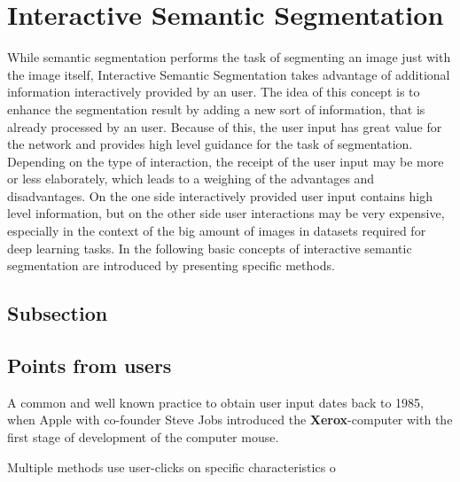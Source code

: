 
\section{Interactive Semantic Segmentation}\label{ord:ch2:sec3}

While semantic segmentation performs the task of segmenting an image just with the image itself, Interactive Semantic Segmentation takes advantage of additional information interactively provided by an user.
The idea of this concept is to enhance the segmentation result by adding a new sort of information, that is already processed by an user.
Because of this, the user input has great value for the network and provides high level guidance for the task of segmentation.
Depending on the type of interaction, the receipt of the user input may be more or less elaborately, which leads to a weighing of the advantages and disadvantages.
On the one side interactively provided user input contains high level information, but on the other side user interactions may be very expensive, especially in the context of the big amount of images in datasets required for deep learning tasks.
In the following basic concepts of interactive semantic segmentation are introduced by presenting specific methods.
 

\subsection{Subsection}\label{ord:ch2:sec3:subsec1}

\subsection{Points from users}\label{ord:ch2:sec3:subsec2}

A common and well known practice to obtain user input dates back to 1985, when Apple with co-founder Steve Jobs introduced the \textbf{Xerox}-computer with the first stage of development of the computer mouse.

Multiple methods use user-clicks on specific characteristics o
